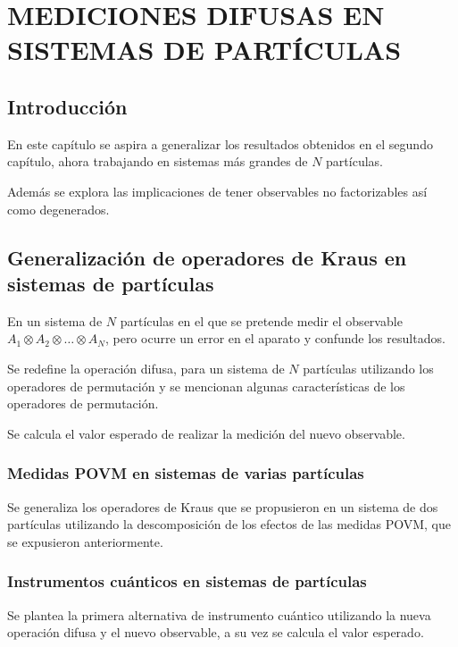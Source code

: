 \chapter{ MEDICIONES DIFUSAS EN SISTEMAS DE \texorpdfstring{}{N} PARTÍCULAS}
\section{ Introducción}


En este capítulo se aspira a generalizar los resultados obtenidos en el segundo capítulo, ahora trabajando en sistemas más grandes de $N$ partículas.





Además se explora las implicaciones de tener observables no factorizables así como degenerados.








\section{Generalización de operadores de Kraus en sistemas de \texorpdfstring{}{N} partículas}



En un sistema de $N$ partículas en el que se pretende medir el observable $A_1\otimes A_2\otimes \hdots \otimes A_N$, pero ocurre un error en  el aparato y confunde los resultados.

Se redefine la operación difusa, para un sistema de $N$ partículas utilizando los operadores de permutación y se mencionan algunas características de los operadores de permutación. 

Se calcula el valor esperado de realizar la medición del nuevo observable.


\subsection{Medidas POVM en sistemas de varias partículas}
  Se generaliza los operadores de Kraus que se propusieron en un sistema de dos partículas utilizando la descomposición de los efectos de las medidas POVM, que se expusieron anteriormente.
 
 \subsection{Instrumentos cuánticos en sistemas de \texorpdfstring{}{N} partículas} 
  Se plantea la primera alternativa de instrumento cuántico utilizando la nueva operación difusa y el nuevo observable, a su vez se calcula el valor esperado. 
  
